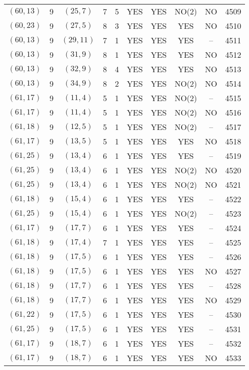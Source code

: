 \begin{longtable}{|c|c|c|c|c|c|c|c|c|c|}
$(60, 13)$ & 9 & $(25, 7)$ & 7 & 5 & YES & YES & NO(2) & NO & 4509\\
$(60, 23)$ & 9 & $(27, 5)$ & 8 & 3 & YES & YES & YES & NO & 4510\\
$(60, 13)$ & 9 & $(29, 11)$ & 7 & 1 & YES & YES & YES & -- & 4511\\
$(60, 13)$ & 9 & $(31, 9)$ & 8 & 1 & YES & YES & YES & NO & 4512\\
$(60, 13)$ & 9 & $(32, 9)$ & 8 & 4 & YES & YES & YES & NO & 4513\\
$(60, 13)$ & 9 & $(34, 9)$ & 8 & 2 & YES & YES & NO(2) & NO & 4514\\
$(61, 17)$ & 9 & $(11, 4)$ & 5 & 1 & YES & YES & NO(2) & -- & 4515\\
$(61, 17)$ & 9 & $(11, 4)$ & 5 & 1 & YES & YES & NO(2) & NO & 4516\\
$(61, 18)$ & 9 & $(12, 5)$ & 5 & 1 & YES & YES & NO(2) & -- & 4517\\
$(61, 17)$ & 9 & $(13, 5)$ & 5 & 1 & YES & YES & YES & NO & 4518\\
$(61, 25)$ & 9 & $(13, 4)$ & 6 & 1 & YES & YES & YES & -- & 4519\\
$(61, 25)$ & 9 & $(13, 4)$ & 6 & 1 & YES & YES & NO(2) & NO & 4520\\
$(61, 25)$ & 9 & $(13, 4)$ & 6 & 1 & YES & YES & NO(2) & NO & 4521\\
$(61, 18)$ & 9 & $(15, 4)$ & 6 & 1 & YES & YES & YES & -- & 4522\\
$(61, 25)$ & 9 & $(15, 4)$ & 6 & 1 & YES & YES & NO(2) & -- & 4523\\
$(61, 17)$ & 9 & $(17, 7)$ & 6 & 1 & YES & YES & YES & -- & 4524\\
$(61, 18)$ & 9 & $(17, 4)$ & 7 & 1 & YES & YES & YES & -- & 4525\\
$(61, 18)$ & 9 & $(17, 5)$ & 6 & 1 & YES & YES & YES & -- & 4526\\
$(61, 18)$ & 9 & $(17, 5)$ & 6 & 1 & YES & YES & YES & NO & 4527\\
$(61, 18)$ & 9 & $(17, 7)$ & 6 & 1 & YES & YES & YES & -- & 4528\\
$(61, 18)$ & 9 & $(17, 7)$ & 6 & 1 & YES & YES & YES & NO & 4529\\
$(61, 22)$ & 9 & $(17, 5)$ & 6 & 1 & YES & YES & YES & -- & 4530\\
$(61, 25)$ & 9 & $(17, 5)$ & 6 & 1 & YES & YES & YES & -- & 4531\\
$(61, 17)$ & 9 & $(18, 7)$ & 6 & 1 & YES & YES & YES & -- & 4532\\
$(61, 17)$ & 9 & $(18, 7)$ & 6 & 1 & YES & YES & YES & NO & 4533\\

\end{longtable}
